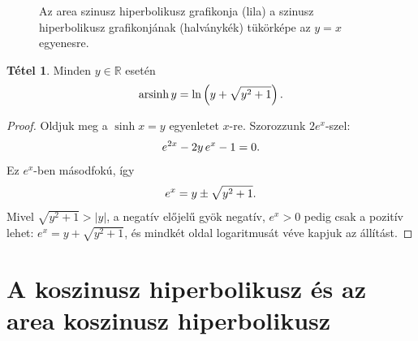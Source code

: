 \documentclass[11pt]{scrartcl}
\DeclareMathOperator{\arsinh}{arsinh}
\theoremstyle{definition}
\newtheorem{theorem}[definition]{Tétel}
\newtheorem{example}[definition]{Példa}
\theoremstyle{remark}
\begin{document}
\begin{figure}[ht]
	\centering
	\caption{Az area szinusz hiperbolikusz grafikonja (lila) a szinusz
		hiperbolikusz grafikonjának (halványkék) tükörképe az $y = x$
		egyenesre.}
	\label{fig:arsinh}
\end{figure}

\begin{theorem}
	Minden $y \in \mathbb{R}$ esetén
	\[
		\arsinh y = \ln\left(y + \sqrt{y^2 + 1}\right)\text.
	\]
\end{theorem}

\begin{proof}
	Oldjuk meg a $\sinh x = y$ egyenletet $x$-re. Szorozzunk $2e^x$-szel:
	\[
		e^{2x} - 2y\,e^x - 1 = 0\text.
	\]
	Ez $e^x$-ben másodfokú, így
	\[
		e^x = y \pm \sqrt{y^2 + 1}\text.
	\]
	Mivel $\sqrt{y^2 + 1} > |y|$, a negatív előjelű gyök negatív, $e^x > 0$
	pedig csak a pozitív lehet: $e^x = y + \sqrt{y^2 + 1}$, és mindkét oldal
	logaritmusát véve kapjuk az állítást.
\end{proof}

%

\section{A koszinusz hiperbolikusz és az area koszinusz hiperbolikusz}
\end{document}
